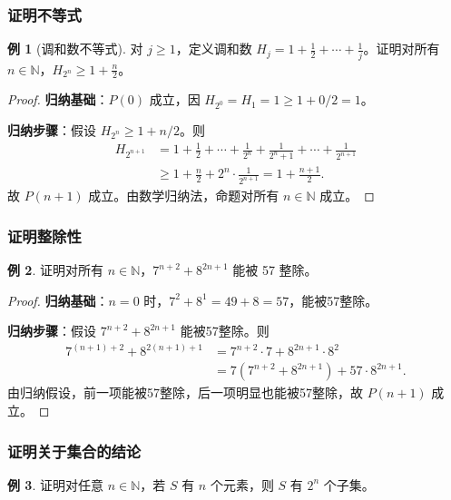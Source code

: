 \documentclass[UTF8,11pt,a4paper]{ctexbook}   %
\theoremstyle{definition}
\newtheorem{example}{例}[section]
\begin{document}
\subsubsection{证明不等式}

\begin{example}[调和数不等式]
对 $j \geq 1$，定义调和数 $H_j = 1 + \frac12 + \cdots + \frac1j$。证明对所有 $n \in \mathbb{N}$，$H_{2^n} \geq 1 + \frac{n}{2}$。
\end{example}

\begin{proof}
\textbf{归纳基础}：$P(0)$ 成立，因 $H_{2^0}=H_1=1 \geq 1+0/2=1$。

\textbf{归纳步骤}：假设 $H_{2^n} \geq 1 + n/2$。则
\begin{align*}
H_{2^{n+1}} &= 1 + \frac12 + \cdots + \frac1{2^n} + \frac1{2^n+1} + \cdots + \frac1{2^{n+1}} \\
&\geq 1 + \frac{n}{2} + 2^n \cdot \frac1{2^{n+1}} = 1 + \frac{n+1}{2}.
\end{align*}
故 $P(n+1)$ 成立。由数学归纳法，命题对所有 $n \in \mathbb{N}$ 成立。
\end{proof}

\subsubsection{证明整除性}

\begin{example}
证明对所有 $n \in \mathbb{N}$，$7^{n+2} + 8^{2n+1}$ 能被 57 整除。
\end{example}

\begin{proof}
\textbf{归纳基础}：$n=0$ 时，$7^2 + 8^1 = 49+8=57$，能被57整除。

\textbf{归纳步骤}：假设 $7^{n+2}+8^{2n+1}$ 能被57整除。则
\begin{align*}
7^{(n+1)+2} + 8^{2(n+1)+1} &= 7^{n+2}\cdot 7 + 8^{2n+1}\cdot 8^2 \\
&= 7(7^{n+2}+8^{2n+1}) + 57\cdot 8^{2n+1}.
\end{align*}
由归纳假设，前一项能被57整除，后一项明显也能被57整除，故 $P(n+1)$ 成立。
\end{proof}

\subsubsection{证明关于集合的结论}

\begin{example}
证明对任意 $n \in \mathbb{N}$，若 $S$ 有 $n$ 个元素，则 $S$ 有 $2^n$ 个子集。
\end{example}
\end{document}
